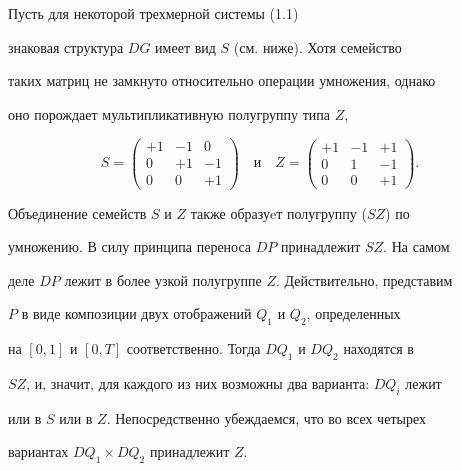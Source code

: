 \begin{exam} 


Пусть для некоторой трехмерной системы (1.1) 


знаковая структура $D G$ имеет вид $S$ (см. ниже). Хотя семейство 


таких матриц не замкнуто относительно операции умножения, однако 


оно порождает мультипликативную полугруппу типа $Z$, 


\begin{equation} 


S= 


\begin{pmatrix} 


+1 & -1 & 0 \\ 0 & +1 & -1 \\ 0 & 0 & +1 


\end{pmatrix} 


\quad\text{и}\quad 


Z= 


\begin{pmatrix} 


+1 & -1 & +1 \\ 0 & 1 & -1 \\ 0 & 0 & +1 


\end{pmatrix} 


. 


\end{equation} 


Объединение семейств $S$ и $Z$ также образуeт полугруппу ($S Z$) по 


умножению. В силу принципа переноса $D P$ принадлежит $S Z$. На самом 


деле $D P$ лежит в более узкой полугруппе $Z$. Действительно, представим 


$P$ в виде композиции двух отображений $Q_1$ и $Q_2$, определенных 


на $[0,1]$ и $[0,T]$ соответственно. Тогда $D Q_1$ и $D Q_2$ находятся в 


$S Z$, и, значит, для каждого из них возможны два варианта: $D Q_i$ лежит 


или в $S$ или в $Z$. Непосредственно убеждаемся, что во всех четырех 


вариантах $D Q_1\times D Q_2$ принадлежит $Z$. 


\end{exam} 


